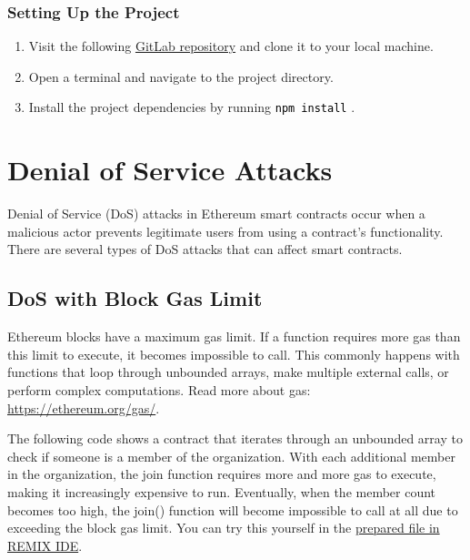 \documentclass[12pt]{article}
\newcommand{\codegrey}[1]{%
  \texttt{\colorbox{black!4}{\textcolor{black}{#1}}}%
}
\begin{document}
\subsubsection*{Setting Up the Project}

\begin{enumerate}
    \item Visit the following
          \href{https://gitlab.fel.cvut.cz/radovluk/smart-contracts-exercises/-/tree/main/07-Out-of-Gas/task/task-code}{GitLab
              repository} and clone it to your local machine.
    \item Open a terminal and navigate to the project directory.
    \item Install the project dependencies by running \codegrey{npm install}.
\end{enumerate}

\section{Denial of Service Attacks}

Denial of Service (DoS) attacks in Ethereum smart contracts occur when a
malicious actor prevents legitimate users from using a contract's
functionality. There are several types of DoS attacks that can affect smart
contracts.

\subsection{DoS with Block Gas Limit}

Ethereum blocks have a maximum gas limit. If a function requires more gas than
this limit to execute, it becomes impossible to call. This commonly happens
with functions that loop through unbounded arrays, make multiple external
calls, or perform complex computations. Read more about gas:
\href{https://ethereum.org/gas/}{https://ethereum.org/gas/}.

The following code shows a contract that iterates through an unbounded array to
check if someone is a member of the organization. With each additional member
in the organization, the join function requires more and more gas to execute,
making it increasingly expensive to run. Eventually, when the member count
becomes too high, the join() function will become impossible to call at all due
to exceeding the block gas limit. You can try this yourself in the
\href{https://remix.ethereum.org/?#activate=solidity&url=https://github.com/radovluk/unbreakable-vault/contracts/DoS01.sol&lang=en&optimize=false&runs=200&evmVersion=null&version=soljson-v0.8.28+commit.7893614a.js}{prepared
    file in REMIX IDE}.
\end{document}
